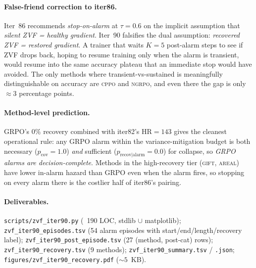 \paragraph{False-friend correction to iter86.}
Iter~86 recommends \emph{stop-on-alarm} at $\tau=0.6$ on the
implicit assumption that \emph{silent ZVF = healthy gradient}.
Iter~90 falsifies the dual assumption: \emph{recovered ZVF
= restored gradient}. A trainer that waits $K=5$ post-alarm steps
to see if ZVF drops back, hoping to resume training only when the
alarm is transient, would resume into the same accuracy plateau that
an immediate stop would have avoided. The only methods where
transient-vs-sustained is meaningfully distinguishable on accuracy
are \textsc{cppo} and \textsc{ngrpo}, and even there the gap is
only $\approx 3$ percentage points.

\paragraph{Method-level prediction.}
GRPO's $0\%$ recovery combined with iter82's $\mathrm{HR}=143$
gives the cleanest operational rule: any GRPO alarm within the
variance-mitigation budget is both necessary ($p_{\text{cov}}=1.0$)
\emph{and} sufficient ($p_{\text{recov|alarm}}=0.0$) for collapse,
so \emph{GRPO alarms are decision-complete}. Methods in the
high-recovery tier (\textsc{gift}, \textsc{areal}) have lower
in-alarm hazard than GRPO even when the alarm fires, so stopping
on every alarm there is the costlier half of iter86's pairing.

\paragraph{Deliverables.} \texttt{scripts/zvf\_iter90.py} (~190 LOC,
stdlib $\cup$ matplotlib); \texttt{zvf\_iter90\_episodes.tsv}
(54 alarm episodes with start/end/length/recovery label);
\texttt{zvf\_iter90\_post\_episode.tsv} (27 (method, post-cat) rows);
\texttt{zvf\_iter90\_recovery.tsv} (9 methods);
\texttt{zvf\_iter90\_summary.tsv} / \texttt{.json};
\texttt{figures/zvf\_iter90\_recovery.pdf} ($\sim 5$~KB).
